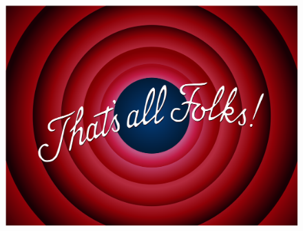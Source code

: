 \documentclass[11pt,fleqn,oneside]{book} %
\begin{document}
% 

% 

% 

% 

% 

\newpage
{}

\begin{figure}[!htbp]
    \centering
    \includegraphics[width=\linewidth]{tikz/chapter12 - That's all Folks.png}
    \caption{}
\end{figure}
\end{document}
